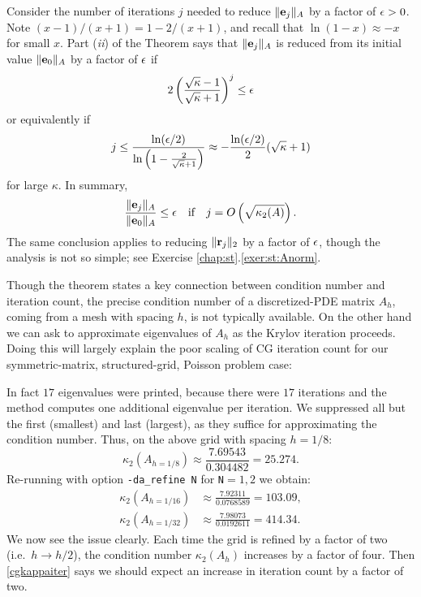 Consider the number of iterations $j$ needed to reduce $\|\mathbf{e}_j\|_A$ by a factor of $\epsilon>0$.  Note $(x-1)/(x+1) = 1 - 2/(x+1)$, and recall that $\ln(1-x) \approx -x$ for small $x$.  Part (\emph{ii}) of the Theorem says that $\|\mathbf{e}_j\|_A$ is reduced from its initial value $\|\mathbf{e}_0\|_A$ by a factor of $\epsilon$ if
    $$2 \left(\frac{\sqrt{\kappa}-1}{\sqrt{\kappa}+1}\right)^j \le \epsilon$$
or equivalently if
    $$j \le \frac{\ln(\epsilon/2)}{\ln\left(1 - \frac{2}{\sqrt{\kappa}+1}\right)} \approx -\frac{\ln(\epsilon/2)}{2} (\sqrt{\kappa}+1)$$
for large $\kappa$.  In summary,
\begin{equation}
\frac{\|\mathbf{e}_j\|_A}{\|\mathbf{e}_0\|_A} \le \epsilon \quad \text{if} \quad j = O\left(\sqrt{\kappa_2(A)}\right).  \label{cgkappaiter}
\end{equation}
The same conclusion applies to reducing $\|\mathbf{r}_j\|_2$ by a factor of $\epsilon$, though the analysis is not so simple; see Exercise \ref{chap:st}.\ref{exer:st:Anorm}.

Though the theorem states a key connection between condition number and iteration count, the precise condition number of a discretized-PDE matrix $A_h$, coming from a mesh with spacing $h$, is not typically available.  On the other hand we can ask \PETSc to approximate eigenvalues of $A_h$ as the Krylov iteration proceeds.  Doing this will largely explain the poor scaling of CG iteration count for our symmetric-matrix, structured-grid, Poisson problem case:
In fact $17$ eigenvalues were printed, because there were $17$ \pKSP iterations and the method computes one additional eigenvalue per iteration.  We suppressed all but the first (smallest) and last (largest), as they suffice for approximating the condition number.  Thus, on the above grid with spacing $h=1/8$:
    $$\kappa_2(A_{h=1/8}) \approx \frac{7.69543}{0.304482} = 25.274.$$
Re-running with option \texttt{-da\_refine N} for \texttt{N}$=1,2$ we obtain:
\begin{align*}
    \kappa_2(A_{h=1/16}) &\approx \frac{7.92311}{0.0768589} = 103.09, \\
    \kappa_2(A_{h=1/32}) &\approx \frac{7.98073}{0.0192611} = 414.34.
\end{align*}
We now see the issue clearly.  Each time the grid is refined by a factor of two (i.e.~$h\to h/2$), the condition number $\kappa_2(A_h)$ increases by a factor of four.  Then \eqref{cgkappaiter} says we should expect an increase in iteration count by a factor of two.

